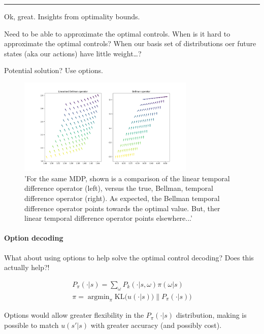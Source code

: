 \begin{center}\rule{0.5\linewidth}{\linethickness}\end{center}

Ok, great. Insights from optimality bounds.

Need to be able to approximate the optimal controls. When is it hard to
approximate the optimal controls? When our basis set of distributions
oer future states (aka our actions) have little weight\ldots{}?

Potential solution? Use options.

\begin{figure}
\centering
\includegraphics[width=0.75\textwidth,height=0.5\textheight]{../../pictures/figures/LBO_BO.png}
\caption{'For the same MDP, shown is a comparison of the linear temporal difference operator (left), versus the true, Bellman, temporal difference operator (right). As expected, the Bellman temporal difference operator points towards the optimal value. But, ther linear temporal difference operator points elsewhere...'}
\end{figure}

\hypertarget{option-decoding}{%
\paragraph{Option decoding}\label{option-decoding}}

What about using options to help solve the optimal control decoding?
Does this actually help?!

\begin{align}
P_{\pi}(\cdot | s) = \sum_\omega P_k(\cdot | s, \omega) \pi(\omega | s) \\
\pi = \mathop{\text{argmin}}_{\pi} \text{KL}\Big(u(\cdot | s))\parallel P_{\pi}(\cdot | s)\Big)
\end{align}

Options would allow greater flexibility in the \(P_{\pi}(\cdot | s)\)
distribution, making is possible to match \(u(s'|s)\) with greater
accuracy (and possibly cost).

